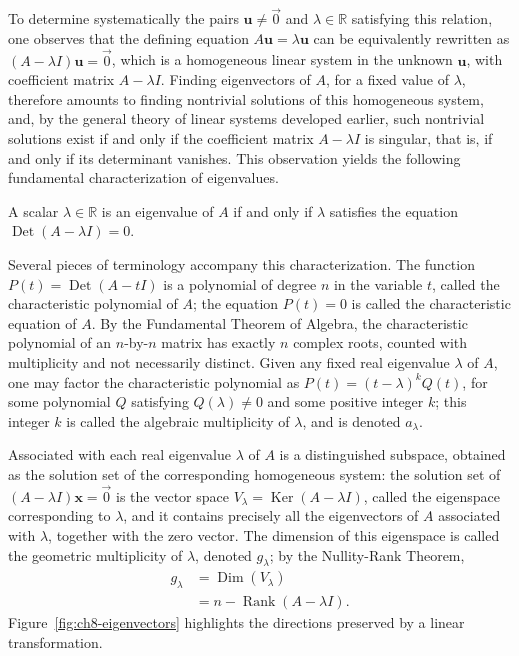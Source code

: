 To determine systematically the pairs $\mathbf{u} \neq \vec{0}$ and $\lambda \in \mathbb{R}$ satisfying this relation, one observes that the defining equation $A\mathbf{u} = \lambda \mathbf{u}$ can be equivalently rewritten as $(A - \lambda I)\mathbf{u} = \vec{0}$, which is a homogeneous linear system in the unknown $\mathbf{u}$, with coefficient matrix $A - \lambda I$. Finding eigenvectors of $A$, for a fixed value of $\lambda$, therefore amounts to finding nontrivial solutions of this homogeneous system, and, by the general theory of linear systems developed earlier, such nontrivial solutions exist if and only if the coefficient matrix $A - \lambda I$ is singular, that is, if and only if its determinant vanishes. This observation yields the following fundamental characterization of eigenvalues.

\begin{theorem}
A scalar $\lambda \in \mathbb{R}$ is an eigenvalue of $A$ if and only if $\lambda$ satisfies the equation $\operatorname{Det}(A - \lambda I) = 0$.
\end{theorem}

Several pieces of terminology accompany this characterization. The function $P(t) = \operatorname{Det}(A - tI)$ is a polynomial of degree $n$ in the variable $t$, called the characteristic polynomial of $A$; the equation $P(t) = 0$ is called the characteristic equation of $A$. By the Fundamental Theorem of Algebra, the characteristic polynomial of an $n$-by-$n$ matrix has exactly $n$ complex roots, counted with multiplicity and not necessarily distinct. Given any fixed real eigenvalue $\lambda$ of $A$, one may factor the characteristic polynomial as $P(t) = (t-\lambda)^k Q(t)$, for some polynomial $Q$ satisfying $Q(\lambda) \neq 0$ and some positive integer $k$; this integer $k$ is called the algebraic multiplicity of $\lambda$, and is denoted $a_\lambda$.

Associated with each real eigenvalue $\lambda$ of $A$ is a distinguished subspace, obtained as the solution set of the corresponding homogeneous system: the solution set of $(A-\lambda I)\mathbf{x} = \vec{0}$ is the vector space $V_\lambda = \operatorname{Ker}(A - \lambda I)$, called the eigenspace corresponding to $\lambda$, and it contains precisely all the eigenvectors of $A$ associated with $\lambda$, together with the zero vector. The dimension of this eigenspace is called the geometric multiplicity of $\lambda$, denoted $g_\lambda$; by the Nullity-Rank Theorem,
\[
\begin{aligned}
g_\lambda &= \operatorname{Dim}(V_\lambda) \\
&= n - \operatorname{Rank}(A - \lambda I).
\end{aligned}
\]
Figure~\ref{fig:ch8-eigenvectors} highlights the directions preserved by a linear transformation.

